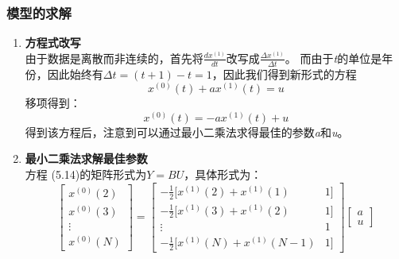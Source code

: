 \documentclass[a4paper, 12pt]{article}
\numberwithin{equation}{section}
\begin{document}
                \subsubsection{模型的求解}
                    \begin{enumerate}
                        \item \textbf{方程式改写} \\
                            由于数据是离散而非连续的，首先将$ \frac{dx^{ (1)}}{dt} $改写成$ \frac{\Delta x^{ (1)}}{\Delta t} $。
                            而由于\textit{t}的单位是年份，因此始终有$ \Delta t = (t + 1) - t = 1 $，因此我们得到新形式的方程 \\
                            \[ x^{ (0)} (t) + ax^{ (1)} (t) = u \]
                            移项得到：
                            \begin{equation}
                                x^{ (0)} (t) = -ax^{ (1)} (t) + u
                            \end{equation}
                            得到该方程后，注意到可以通过最小二乘法求得最佳的参数\textit{a}和\textit{u}。


                        \item \textbf{最小二乘法求解最佳参数} \\
                            方程 (5.14)的矩阵形式为$ Y = BU $，具体形式为：
                            \begin{equation}
                                \begin{bmatrix}
                                    x^{ (0)} (2) \\
                                    x^{ (0)} (3) \\
                                    \vdots \\
                                    x^{ (0)} (N)
                                \end{bmatrix}
                                =
                                \begin{bmatrix}
                                    -\frac{1}{2} [ x^{ (1)} (2) + x^{ (1)} (1) & 1] \\
                                    -\frac{1}{2} [ x^{ (1)} (3) + x^{ (1)} (2) & 1] \\
                                    \vdots & 1 \\
                                    -\frac{1}{2} [ x^{ (1)} (N) + x^{ (1)} (N - 1) & 1]
                                \end{bmatrix}
                                \begin{bmatrix}
                                    a \\
                                    u
                                \end{bmatrix}
                            \end{equation}


\end{enumerate}
\end{document}
